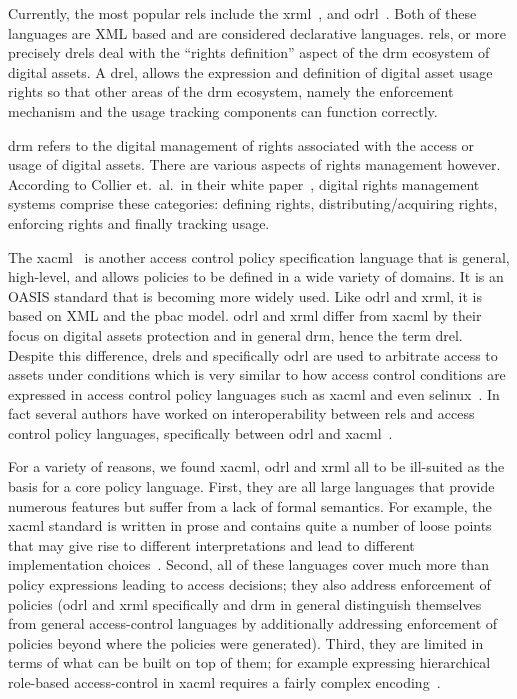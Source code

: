\documentclass[runningheads,a4paper]{llncs}
\begin{document}
Currently, the most popular \ac{rel}s include the
\ac{xrml}~\cite{Wang}, and \ac{odrl}~\cite{odrloneone}. Both of these
languages are XML based and are considered declarative
languages. \ac{rel}s, or more precisely \ac{drel}s deal with the ``rights
definition'' aspect of the \ac{drm} ecosystem of digital assets. 
A \ac{drel}, allows the expression and definition
of digital asset usage rights so that other areas of the \ac{drm}
ecosystem, namely the enforcement mechanism and the usage tracking
components can function correctly.

\ac{drm} refers to the digital management of rights associated with
the access or usage of digital assets. There are various aspects of
rights management however.
According to Collier et.\ al.\ in their white paper~\cite{collier},
%
digital rights management systems comprise these categories: defining
rights, distributing/acquiring rights, enforcing rights and finally
tracking usage.


The \ac{xacml}~\cite{xacml3} is another access control policy
specification language that is general, high-level, and allows
policies to be defined in a wide variety of domains.  It is an OASIS
standard that is becoming more widely used.  Like \ac{odrl} and
\ac{xrml}, it is based on XML and the \ac{pbac} model.  \ac{odrl} and
\ac{xrml} differ from \ac{xacml} by their focus on digital assets
protection and in general \ac{drm}, hence the term \ac{drel}.  Despite
this difference, \ac{drel}s and specifically \ac{odrl} are used to
arbitrate access to assets under conditions which is very similar to
how access control conditions are expressed in access control policy
languages such as \ac{xacml} and even \ac{selinux}~\cite{selinux}. In
fact several authors have worked on interoperability between \ac{rel}s
and access control policy languages, specifically between \ac{odrl}
and
\ac{xacml}~\cite{prados2005interoperability,maronas2009architecture}.


For a variety of reasons, we found \ac{xacml}, \ac{odrl} and \ac{xrml}
all to be ill-suited as the basis for a core policy language.  First,
they are all large languages that provide numerous features but suffer
from a lack of formal semantics. For example, the \ac{xacml} standard
is written in prose and contains quite a number of loose points that
may give rise to different interpretations and lead to different
implementation choices~\cite{DBLP:conf/essos/MasiPT12}.  Second, all
of these languages cover much more than policy expressions leading to
access decisions; they also address enforcement of policies (\ac{odrl}
and \ac{xrml} specifically and \ac{drm} in general distinguish
themselves from general access-control languages by additionally
addressing enforcement of policies beyond where the policies were
generated). Third, they are limited in terms of what can be built on
top of them; for example expressing hierarchical role-based
access-control in \ac{xacml} requires a fairly complex
encoding~\cite{Tschantz}.
\end{document}
